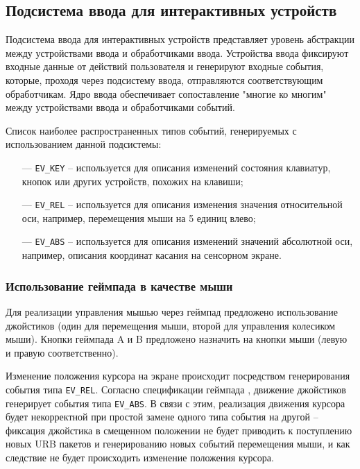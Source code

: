 \subsection{Подсистема ввода для интерактивных устройств}

Подсистема ввода для интерактивных устройств представляет уровень абстракции между устройствами ввода и обработчиками ввода. Устройства ввода фиксируют входные данные от действий пользователя и генерируют входные события, которые, проходя через подсистему ввода, отправляются соответствующим обработчикам. Ядро ввода обеспечивает сопоставление "многие ко многим"\, между устройствами ввода и обработчиками событий.

Список наиболее распространенных типов событий, генерируемых с использованием данной подсистемы:

\begin{itemize}[leftmargin=1.6\parindent]
    \item[---] \texttt{EV\_KEY} -- используется для описания изменений состояния клавиатур, кнопок или других устройств, похожих на клавиши;
    \item[---] \texttt{EV\_REL} -- используется для описания изменения значения относительной оси, например, перемещения мыши на 5 единиц влево;
    \item[---] \texttt{EV\_ABS} -- используется для описания изменений значений абсолютной оси, например, описания координат касания на сенсорном экране.
\end{itemize}

\subsubsection{Использование геймпада в качестве мыши}

Для реализации управления мышью через геймпад предложено использование джойстиков (один для перемещения мыши, второй для управления колесиком мыши). Кнопки геймпада A и B предложено назначить на кнопки мыши (левую и правую соответственно).

Изменение положения курсора на экране происходит посредством генерирования события типа \texttt{EV\_REL}. Согласно спецификации геймпада \cite{gamepad-spec}, движение джойстиков генерирует события типа \texttt{EV\_ABS}. В связи с этим, реализация движения курсора будет некорректной при простой замене одного типа события на другой -- фиксация джойстика в смещенном положении не будет приводить к поступлению новых URB пакетов и генерированию новых событий перемещения мыши, и как следствие не будет происходить изменение положения курсора.

